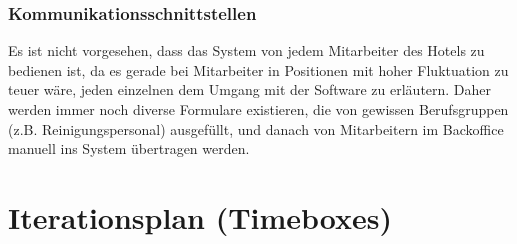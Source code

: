 \documentclass[10pt,a4paper,titlepage]{article}
\begin{document}
\subsubsection{Kommunikationsschnittstellen}
Es ist nicht vorgesehen, dass das System von jedem Mitarbeiter des Hotels zu bedienen ist, da es gerade bei Mitarbeiter in Positionen mit hoher Fluktuation zu teuer wäre, jeden einzelnen dem Umgang mit der Software zu erläutern. Daher werden immer noch diverse Formulare existieren, die von gewissen Berufsgruppen (z.B. Reinigungspersonal) ausgefüllt, und danach von Mitarbeitern im Backoffice manuell ins System übertragen werden.

\newpage

\section{Iterationsplan (Timeboxes)}

\newpage

\printglossary[title=Glossar,toctitle=GLOSSAR]
\end{document}
